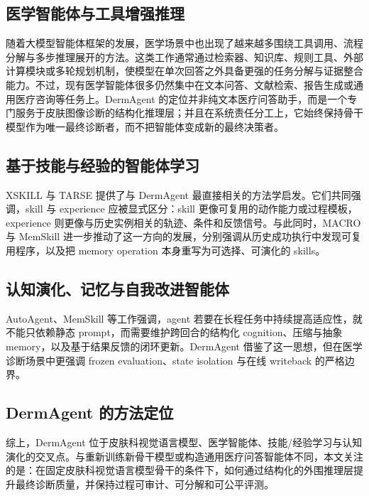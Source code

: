 \documentclass{article}
\begin{document}
\subsection{医学智能体与工具增强推理}

随着大模型智能体框架的发展，医学场景中也出现了越来越多围绕工具调用、流程分解与多步推理展开的方法。这类工作通常通过检索器、知识库、规则工具、外部计算模块或多轮规划机制，使模型在单次回答之外具备更强的任务分解与证据整合能力\citep{healthcare_agents_review_2026}。不过，现有医学智能体很多仍然集中在文本问答、文献检索、报告生成或通用医疗咨询等任务上。DermAgent 的定位并非纯文本医疗问答助手，而是一个专门服务于皮肤图像诊断的结构化推理层；并且在系统责任分工上，它始终保持骨干模型作为唯一最终诊断者，而不把智能体变成新的最终决策者。

\subsection{基于技能与经验的智能体学习}

XSKILL 与 TARSE 提供了与 DermAgent 最直接相关的方法学启发。它们共同强调，skill 与 experience 应被显式区分：skill 更像可复用的动作能力或过程模板，experience 则更像与历史实例相关的轨迹、条件和反馈信号\citep{xskill_2026,tarse_2026}。与此同时，MACRO 与 MemSkill 进一步推动了这一方向的发展，分别强调从历史成功执行中发现可复用程序，以及把 memory operation 本身重写为可选择、可演化的 skills\citep{macro_2026,memskill_2026}。

\subsection{认知演化、记忆与自我改进智能体}

AutoAgent、MemSkill 等工作强调，agent 若要在长程任务中持续提高适应性，就不能只依赖静态 prompt，而需要维护跨回合的结构化 cognition、压缩与抽象 memory，以及基于结果反馈的闭环更新\citep{autoagent_2026,memskill_2026}。DermAgent 借鉴了这一思想，但在医学诊断场景中更强调 frozen evaluation、state isolation 与在线 writeback 的严格边界。

\subsection{DermAgent 的方法定位}

综上，DermAgent 位于皮肤科视觉语言模型、医学智能体、技能/经验学习与认知演化的交叉点。与重新训练新骨干模型或构造通用医疗问答智能体不同，本文关注的是：在固定皮肤科视觉语言模型骨干的条件下，如何通过结构化的外围推理层提升最终诊断质量，并保持过程可审计、可分解和可公平评测。
\end{document}
